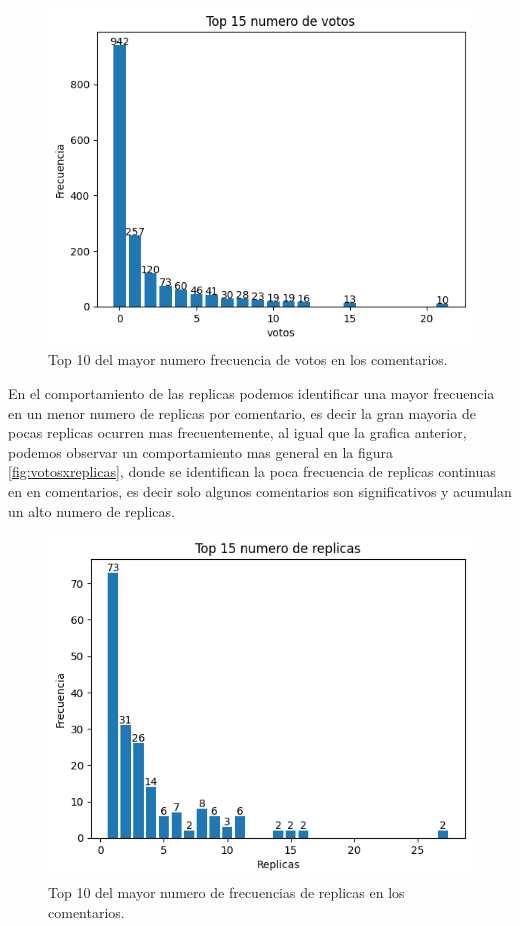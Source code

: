 \begin{figure}[h!]
	\centering
	\includegraphics[width=14cm]{../Datos/Top10Votos}
	\caption{Top 10 del mayor numero frecuencia de votos en los comentarios.}
	\label{fig:top10V}
\end{figure}

En el comportamiento de las replicas podemos identificar una mayor frecuencia en un menor numero de replicas por comentario, es decir la gran mayoria de pocas replicas ocurren mas frecuentemente, al igual que la grafica anterior, podemos observar un comportamiento mas general en la figura \ref{fig:votosxreplicas}, donde se identifican la poca frecuencia de replicas continuas en en comentarios, es decir solo algunos comentarios son significativos y acumulan un alto numero de replicas.\\

\begin{figure}[h!]
	\centering
	\includegraphics[width=13cm]{../Datos/Top10Replicas}
	\caption{Top 10 del mayor numero de frecuencias de replicas en los comentarios.}
	\label{fig:top10R}
\end{figure}


